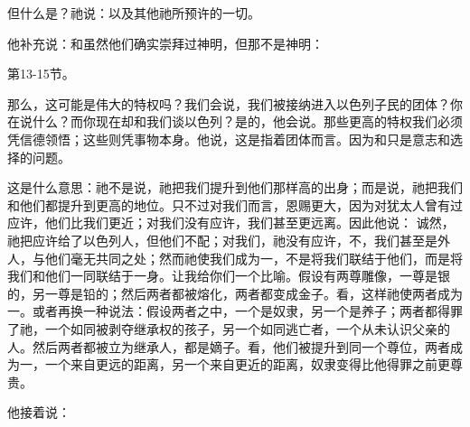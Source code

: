 但什么是？祂说：以及其他祂所预许的一切。\par

他补充说：和虽然他们确实崇拜过神明，但那不是神明：\par

第13-15节。\par

那么，这可能是伟大的特权吗？我们会说，我们被接纳进入以色列子民的团体？你在说什么？而你现在却和我们谈以色列？是的，他会说。那些更高的特权我们必须凭信德领悟；这些则凭事物本身。他说，这是指着团体而言。因为和只是意志和选择的问题。\par

\par

这是什么意思：祂不是说，祂把我们提升到他们那样高的出身；而是说，祂把我们和他们都提升到更高的地位。只不过对我们而言，恩赐更大，因为对犹太人曾有过应许，他们比我们更近；对我们没有应许，我们甚至更远离。因此他说： 诚然，祂把应许给了以色列人，但他们不配；对我们，祂没有应许，不，我们甚至是外人，与他们毫无共同之处；然而祂使我们成为一，不是将我们联结于他们，而是将我们和他们一同联结于一身。让我给你们一个比喻。假设有两尊雕像，一尊是银的，另一尊是铅的；然后两者都被熔化，两者都变成金子。看，这样祂使两者成为一。或者再换一种说法：假设两者之中，一个是奴隶，另一个是养子；两者都得罪了祂，一个如同被剥夺继承权的孩子，另一个如同逃亡者，一个从未认识父亲的人。然后两者都被立为继承人，都是嫡子。看，他们被提升到同一个尊位，两者成为一，一个来自更远的距离，另一个来自更近的距离，奴隶变得比他得罪之前更尊贵。\par

他接着说：\par

